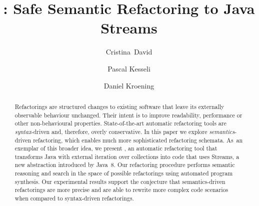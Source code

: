 \documentclass[runningheads,a4paper]{llncs}
\begin{document}




\title{\tool: Safe Semantic Refactoring to Java Streams}

\author{
\mbox{Cristina David} \and
Pascal Kesseli \and
Daniel Kroening}





\maketitle

\begin{abstract}
%
  Refactorings are structured changes to existing software that leave its
  externally observable behaviour unchanged.  Their intent is to improve
  readability, performance or other non-behavioural properties. 
  State-of-the-art automatic refactoring tools are {\em syntax}-driven and,
  therefore, overly conservative.  In this paper we explore {\em
  semantics}-driven refactoring, which enables much more sophisticated
  refactoring schemata.  As~an exemplar of this broader idea, we present
  \tool, an automatic refactoring tool that transforms Java with
  external iteration over collections into code that uses Streams, a new
  abstraction introduced by Java~8.  Our refactoring procedure performs
  semantic reasoning and search in the space of possible refactorings using
  automated program synthesis.  Our experimental results support the
  conjecture that semantics-driven refactorings are more precise and are
  able to rewrite more complex code scenarios when compared to syntax-driven
  refactorings.
%
\end{abstract}
\end{document}
